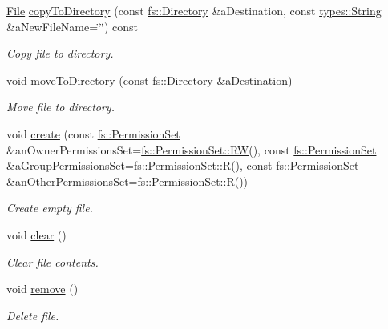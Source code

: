\begin{DoxyCompactItemize}
\hyperlink{classlibrary_1_1core_1_1fs_1_1File}{File} \hyperlink{classlibrary_1_1core_1_1fs_1_1File_a97b8b2deee991e5eefb78e811806788d}{copy\+To\+Directory} (const \hyperlink{classlibrary_1_1core_1_1fs_1_1Directory}{fs\+::\+Directory} \&a\+Destination, const \hyperlink{classlibrary_1_1core_1_1types_1_1String}{types\+::\+String} \&a\+New\+File\+Name=\char`\"{}\char`\"{}) const
\begin{DoxyCompactList}\small\item\em Copy file to directory. \end{DoxyCompactList}\item 
void \hyperlink{classlibrary_1_1core_1_1fs_1_1File_ac81efdfeb17ea50abe23d96f69bc15ae}{move\+To\+Directory} (const \hyperlink{classlibrary_1_1core_1_1fs_1_1Directory}{fs\+::\+Directory} \&a\+Destination)
\begin{DoxyCompactList}\small\item\em Move file to directory. \end{DoxyCompactList}\item 
void \hyperlink{classlibrary_1_1core_1_1fs_1_1File_aa83b1f11be8c9106e780266dc097d03c}{create} (const \hyperlink{classlibrary_1_1core_1_1fs_1_1PermissionSet}{fs\+::\+Permission\+Set} \&an\+Owner\+Permissions\+Set=\hyperlink{classlibrary_1_1core_1_1fs_1_1PermissionSet_a9722204cdc11a0171e1a115d449a134b}{fs\+::\+Permission\+Set\+::\+RW}(), const \hyperlink{classlibrary_1_1core_1_1fs_1_1PermissionSet}{fs\+::\+Permission\+Set} \&a\+Group\+Permissions\+Set=\hyperlink{classlibrary_1_1core_1_1fs_1_1PermissionSet_a48d447273c118d6a7c81aebb505189c6}{fs\+::\+Permission\+Set\+::R}(), const \hyperlink{classlibrary_1_1core_1_1fs_1_1PermissionSet}{fs\+::\+Permission\+Set} \&an\+Other\+Permissions\+Set=\hyperlink{classlibrary_1_1core_1_1fs_1_1PermissionSet_a48d447273c118d6a7c81aebb505189c6}{fs\+::\+Permission\+Set\+::R}())
\begin{DoxyCompactList}\small\item\em Create empty file. \end{DoxyCompactList}\item 
void \hyperlink{classlibrary_1_1core_1_1fs_1_1File_a0b95ab08dd8df2cc28b2e42a72ae0b9a}{clear} ()
\begin{DoxyCompactList}\small\item\em Clear file contents. \end{DoxyCompactList}\item 
void \hyperlink{classlibrary_1_1core_1_1fs_1_1File_a438408d402b994d76d4de3829ec67dbc}{remove} ()
\begin{DoxyCompactList}\small\item\em Delete file. \end{DoxyCompactList}\end{DoxyCompactItemize}
